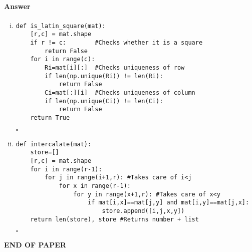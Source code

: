 \documentclass[12pt]{article}
\newcommand{\EOQ}{\hfill $\square$}
\begin{document}
\paragraph{Answer}
\begin{enumerate}[(i)]
\item \begin{verbatim}
def is_latin_square(mat):
    [r,c] = mat.shape
    if r != c:        #Checks whether it is a square
        return False
    for i in range(c):
        Ri=mat[i][:]  #Checks uniqueness of row
        if len(np.unique(Ri)) != len(Ri):
            return False
        Ci=mat[:][i]  #Checks uniqueness of column
        if len(np.unique(Ci)) != len(Ci):
            return False
    return True
\end{verbatim}
\EOQ
\item \begin{verbatim}
def intercalate(mat):
    store=[]
    [r,c] = mat.shape
    for i in range(r-1):
        for j in range(i+1,r): #Takes care of i<j
            for x in range(r-1):
                for y in range(x+1,r): #Takes care of x<y
                    if mat[i,x]==mat[j,y] and mat[i,y]==mat[j,x]:
                        store.append([i,j,x,y])
    return len(store), store #Returns number + list            
\end{verbatim}
\EOQ
\end{enumerate}
\bigskip
\vfill
\begin{center}{\bf END OF PAPER}\end{center}
\end{document}
